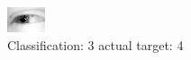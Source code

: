 \begin{figure}[h!]
\begin{center}
\includegraphics[width=0.60\columnwidth]{figures/ID2481_class_3_target_4.png}
\end{center}
\caption{ Classification: 3 actual target: 4}
\label{fig:ID2481_class_3_target_4}
\end{figure}
